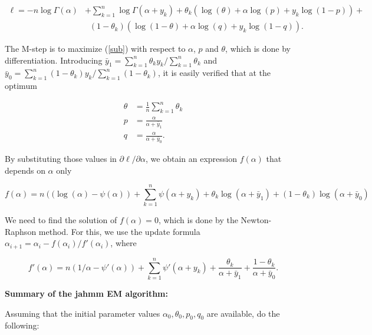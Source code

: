 \documentclass[12pt]{article}
\begin{document}
    \begin{align}
    \ell = -n \log \Gamma(\alpha) &+ \sum_{k=1}^n
      \log \Gamma(\alpha + y_k) + \nonumber
    \theta_k (\log(\theta) + \alpha \log(p) +
    y_k \log(1-p)) + \nonumber \\
    &\;\; (1-\theta_k) (\log(1-\theta) + \alpha \log(q) +
    y_k \log(1-q)).
\label{sub}
    \end{align}

    The M-step is to maximize (\ref{sub}) with respect to
    $\alpha$, $p$ and $\theta$, which is done by
    differentiation. Introducing
    $\bar{y}_1 = \sum_{k=1}^n \theta_k y_k / \sum_{k=1}^n \theta_k$
    and $\bar{y}_0 = \sum_{k=1}^n (1-\theta_k) y_k /
    \sum_{k=1}^n (1-\theta_k)$, it is easily verified that at
    the optimum

    \begin{align*}
    \theta &= \frac{1}{n}\sum_{k=1}^n\theta_k \\
    p &= \frac{\alpha} {\alpha+\bar{y}_1} \\
    q &= \frac{\alpha} {\alpha+\bar{y}_0}.
    \end{align*}

    By substituting those values in $\partial \ell / \partial \alpha$,
    we obtain an expression $f(\alpha)$ that depends on $\alpha$ only

    \begin{equation*}
       f(\alpha) = n \left( (\log(\alpha) - \psi(\alpha) \right) +
      \sum_{k=1}^n \psi(\alpha+y_k) + \theta_k \log(\alpha + \bar{y}_1)
      + (1-\theta_k) \log(\alpha + \bar{y}_0)
    \end{equation*}

    We need to find the solution of $f(\alpha) = 0$, which is done by
    the Newton-Raphson method. For this, we use the update formula
    $\alpha_{i+1} = \alpha_i - f(\alpha_i)/f'(\alpha_i)$, where

    \begin{equation*}
      f'(\alpha) = n \left( 1/\alpha - \psi'(\alpha) \right) +
      \sum_{k=1}^n \psi'(\alpha+y_k) +
      \frac{\theta_k}{\alpha+\bar{y}_1} +
      \frac{1-\theta_k}{\alpha + \bar{y}_0}.
    \end{equation*}

\noindent
    \textbf{Summary of the jahmm EM algorithm:} \par
    Assuming that the initial parameter values
    $\alpha_0, \theta_0, p_0, q_0$ are available, do the following:
\end{document}
